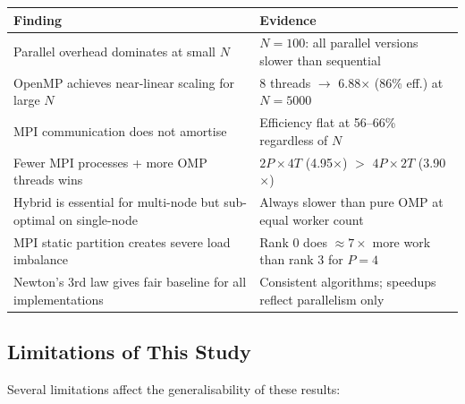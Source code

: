 ﻿\documentclass[12pt,a4paper]{article}
\begin{document}
\begin{center}
\begin{tabular}{p{7cm} p{6.8cm}}
    \toprule
    \textbf{Finding} & \textbf{Evidence} \\
    \midrule
    Parallel overhead dominates at small $N$
        & $N=100$: all parallel versions slower than sequential \\[4pt]
    OpenMP achieves near-linear scaling for large $N$
        & 8 threads $\to$ 6.88$\times$ (86\% eff.) at $N=5000$ \\[4pt]
    MPI communication does not amortise
        & Efficiency flat at 56--66\% regardless of $N$ \\[4pt]
    Fewer MPI processes + more OMP threads wins
        & $2P\times4T$ (4.95$\times$) $>$ $4P\times2T$ (3.90$\times$) \\[4pt]
    Hybrid is essential for multi-node but sub-optimal on single-node
        & Always slower than pure OMP at equal worker count \\[4pt]
    MPI static partition creates severe load imbalance
        & Rank 0 does $\approx 7\times$ more work than rank 3 for $P=4$ \\[4pt]
    Newton's 3rd law gives fair baseline for all implementations
        & Consistent algorithms; speedups reflect parallelism only \\
    \bottomrule
\end{tabular}
\end{center}

\subsection{Limitations of This Study}

Several limitations affect the generalisability of these results:
\end{document}

